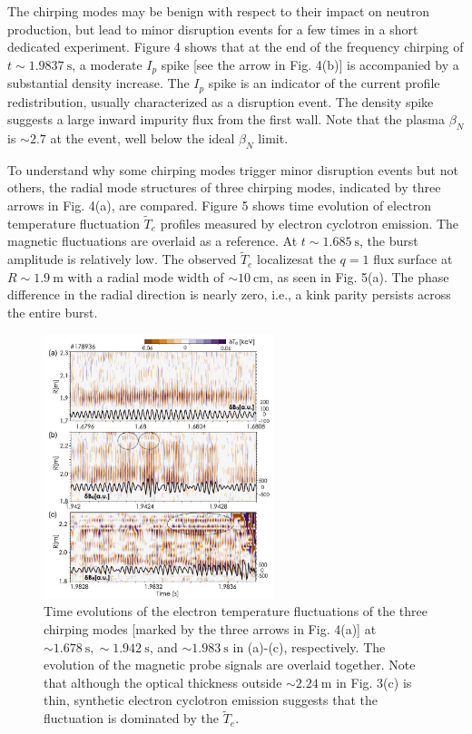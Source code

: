\documentclass[oneside,onecolumn]{article}
\begin{document}
\begin{sloppypar}
 
 The chirping modes may be benign with respect to their impact on neutron production, but lead to minor disruption events for a few times in a short dedicated experiment. Figure 4 shows that at the end of the frequency chirping of $t \sim 1.9837 \mathrm{~s}$, a moderate $I_{p}$ spike [see the arrow in Fig. 4(b)] is accompanied by a substantial density increase. The $I_{p}$ spike is an indicator of the current profile redistribution, usually characterized as a disruption event. The density spike suggests a large inward impurity flux from the first wall. Note that the plasma $\beta_{N}$ is $\sim 2.7$ at the event, well below the ideal $\beta_{N}$ limit.
 
 To understand why some chirping modes trigger minor disruption events but not others, the radial mode structures of three chirping modes, indicated by three arrows in Fig. 4(a), are compared. Figure 5 shows time evolution of electron temperature fluctuation $\tilde{T}_{e}$ profiles measured by electron cyclotron emission. The magnetic fluctuations are overlaid as a reference. At $t \sim 1.685 \mathrm{~s}$, the burst amplitude is relatively low. The observed $\tilde{T}_{e}$ localizesat the $q=1$ flux surface at $R \sim 1.9 \mathrm{~m}$ with a radial mode width of $\sim 10 \mathrm{~cm}$, as seen in Fig. 5(a). The phase difference in the radial direction is nearly zero, i.e., a kink parity persists across the entire burst.
 \begin{figure}[htbp]
 	\centering
 	\includegraphics[max width=0.6\textwidth,max height=1.0\textheight]{2023_06_19_f8dbb752866ca158c73eg-4}
 	\caption{Time evolutions of the electron temperature fluctuations of the three chirping modes [marked by the three arrows in Fig. 4(a)] at $\sim 1.678 \mathrm{~s}, \sim 1.942 \mathrm{~s}$, and $\sim 1.983 \mathrm{~s}$ in (a)-(c), respectively. The evolution of the magnetic probe signals are overlaid together. Note that although the optical thickness outside $\sim 2.24 \mathrm{~m}$ in Fig. 3(c) is thin, synthetic electron cyclotron emission suggests that the fluctuation is dominated by the $\tilde{T}_{e}$.}
 	\label{figure5}
 \end{figure}
 

\end{sloppypar}
\end{document}
